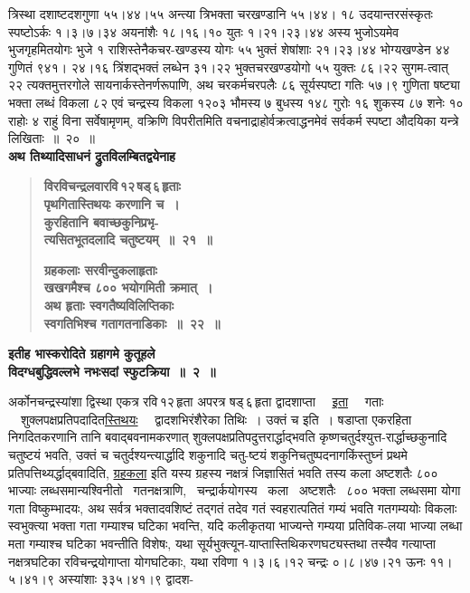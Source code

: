 \documentclass[11pt, openany]{book}
\begin{document}
\newpage

\noindent त्रिस्था दशाष्टदशगुणा ५५।४४।५५ अन्त्या त्रिभक्ता चरखण्डानि ५५।४४। १८ \;उदयान्तरसंस्कृतः \;स्पष्टोऽर्कः \;१।३।७।३४ \;अयनांशैः \;१८।१६।१० \;युतः १।२१।२३।४४ अस्य भुजोऽयमेव भुजगृहमितयोगः भुजे १ राशिस्तेनैकचर-खण्डस्य योगः ५५ भुक्तं शेषांशाः २१।२३।४४ भोग्यखण्डेन ४४ गुणितं ९४१। २४।१६ त्रिंशद्भक्तं लब्धेन ३१।२२ भुक्तचरखण्डयोगो ५५ युक्तः ८६।२२ सुगम-त्वात् २२ त्यक्तमुत्तरगोले सायनार्कस्तेनर्णरूपाणि, अथ चरकर्मचरपलैः ८६ सूर्यस्पष्टा गतिः ५७।९ गुणिता षष्ट्या भक्ता लब्धं विकला ८२ एवं चन्द्रस्य विकला १२०३ भौमस्य ७ बुधस्य १४८ गुरोः १६ शुकस्य ८७ शनेः १० राहोः ४ राहुं विना सर्वेषामृणम्, वक्रिणि विपरीतमिति वचनाद्राहोर्वक्रत्वाद्धनमेवं सर्वकर्म स्पष्टा औदयिका यन्त्रे लिखिताः~॥~२०~॥\\

{\small \textbf{अथ तिथ्यादिसाधनं द्रुतविलम्बितद्वयेनाह\textendash }}

 \label{2.21}
\begin{quote}
{\large \textbf{{\color{purple}विरविचन्द्रलवारवि\textendash \,१२\textendash \,षड्\textendash \,६\textendash \,हृताः \\
पृथगितास्तिथयः करणानि च~। \\
कुरहितानि बवाच्छकुनिप्रभृ-\\
त्यसितभूतदलादि चतुष्टयम्~॥~२१~॥}}

 \label{2.22}
\textbf{{\color{purple}ग्रहकलाः सरवीन्दुकलाहृताः \\
खखगमैश्च ८०० भयोगमिती क्रमात्~। \\
अथ हृताः स्वगतैष्यविलिप्तिकाः \\
स्वगतिभिश्च गतागतनाडिकाः~॥~२२~॥}}}
\end{quote}

\newpage

\begin{center}
{\large \textbf{इतीह भास्करोदिते ग्रहागमे कुतूहले\\ विदग्धबुद्धिवल्लभे नभःसदां स्फुटक्रिया~॥~२~॥}}
\end{center}

अर्कोनचन्द्रस्यांशा द्विस्था एकत्र रवि\textendash \,१२\textendash \,हृता अपरत्र षड्\textendash \,६\textendash \,हृता द्वादशाप्ता ~~\hyperref[2.21]{इता} ~~गताः ~~शुक्लपक्षप्रतिपदादित\hyperref[2.21]{स्तिथयः} ~~द्वादशभिरंशैरेका तिथिः~। उक्तं च इति~। षडाप्ता एकरहिता निगदितकरणानि तानि बवाद्बवनामकरणात् शुक्लपक्षप्रतिपदुत्तरार्द्धाद्भवति कृष्णचतुर्दश्युत्त-रार्द्धाच्छकुनादि चतुष्टयं भवति, उक्तं च चतुर्दश्यन्त्यार्द्धादि शकुनादि चतु-ष्टयं शकुनिचतुष्पदनागकिंस्तुघ्नं प्रथमे प्रतिपत्तिथ्यर्द्धाद्बवादिति, \hyperref[2.22]{ग्रहकला} इति यस्य ग्रहस्य नक्षत्रं जिज्ञासितं भवति तस्य कला अष्टशतैः ८०० भाज्याः लब्धसमान्यश्विनीतो ~गतनक्षत्राणि, ~चन्द्रार्कयोगस्य ~कला ~अष्टशतैः ~८०० भक्ता लब्धसमा योगा गता विष्कुम्भादयः, अथ सर्वत्र भक्तादवशिष्टं तद्गतं तदेव गतं स्वहरात्पतितं गम्यं भवति गतगम्ययोः विकलाः स्वभुक्त्या भक्ता गता गम्याश्च घटिका भवन्ति, यदि कलीकृतया भाज्यन्ते गम्यया प्रतिविक-लया भाज्या लब्धा मता गम्याश्च घटिका भवन्तीति विशेषः, यथा सूर्यभुक्त्यून-याप्तास्तिथिकरणघट्यस्तथा तस्यैव गत्याप्ता नक्षत्रघटिका रविचन्द्रयोगाप्ता योगघटिकाः, यथा रविणा १।३।६।१२ चन्द्रः ०।८।४७।२१ ऊनः ११।५।४१।९ अस्यांशाः ३३५।४१।९ द्वादश-
\end{document}

